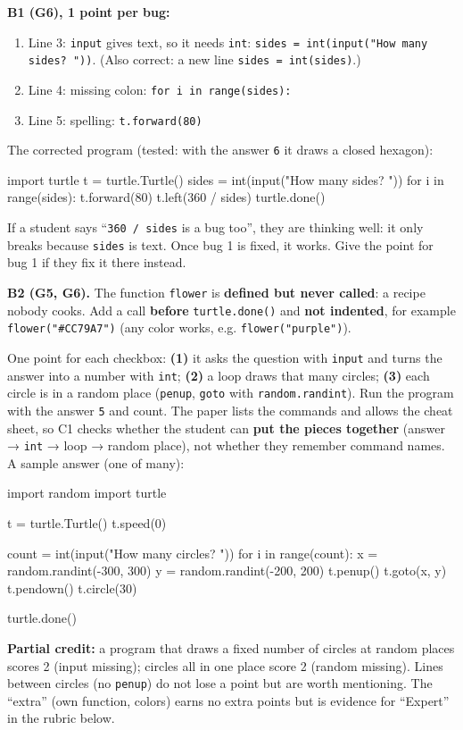 \begin{answer}
\textbf{B1 (G6), 1 point per bug:}
\begin{enumerate}[itemsep=1pt]
  \item Line 3: \texttt{input} gives text, so it needs \texttt{int}: \texttt{sides = int(input("How many sides? "))}.
        (Also correct: a new line \texttt{sides = int(sides)}.)
  \item Line 4: missing colon: \texttt{for i in range(sides):}
  \item Line 5: spelling: \texttt{t.forward(80)}
\end{enumerate}
The corrected program (tested: with the answer \texttt{6} it draws a closed hexagon):
\begin{pycode}
import turtle
t = turtle.Turtle()
sides = int(input("How many sides? "))
for i in range(sides):
    t.forward(80)
    t.left(360 / sides)
turtle.done()
\end{pycode}
If a student says \enquote{\texttt{360 / sides} is a bug too}, they are thinking well: it only breaks because
\texttt{sides} is text. Once bug 1 is fixed, it works. Give the point for bug 1 if they fix it there instead.

\textbf{B2 (G5, G6).} The function \texttt{flower} is \textbf{defined but never called}: a recipe nobody cooks.
Add a call \textbf{before} \texttt{turtle.done()} and \textbf{not indented}, for example
\texttt{flower("\#CC79A7")} (any color works, e.g. \texttt{flower("purple")}).
\end{answer}

\begin{answer}
One point for each checkbox: \textbf{(1)} it asks the question with \texttt{input} and turns the answer into a number with
\texttt{int}; \textbf{(2)} a loop draws that many circles; \textbf{(3)} each circle is in a random place
(\texttt{penup}, \texttt{goto} with \texttt{random.randint}). Run the program with the answer \texttt{5} and count.
The paper lists the commands and allows the cheat sheet, so C1 checks whether the student can \textbf{put the pieces together}
(answer → \texttt{int} → loop → random place), not whether they remember command names.
A sample answer (one of many):
\begin{pycode}
import random
import turtle

t = turtle.Turtle()
t.speed(0)

count = int(input("How many circles? "))
for i in range(count):
    x = random.randint(-300, 300)
    y = random.randint(-200, 200)
    t.penup()
    t.goto(x, y)
    t.pendown()
    t.circle(30)

turtle.done()
\end{pycode}
\textbf{Partial credit:} a program that draws a fixed number of circles at random places scores 2 (input missing);
circles all in one place score 2 (random missing). Lines between circles (no \texttt{penup}) do not lose a point but
are worth mentioning. The \enquote{extra} (own function, colors) earns no extra points but is evidence for
\enquote{Expert} in the rubric below.
\end{answer}


